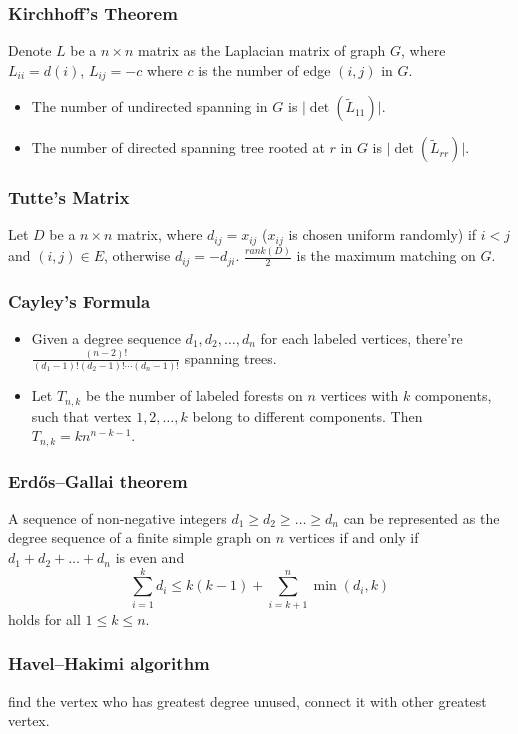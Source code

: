 \subsubsection{Kirchhoff's Theorem}
Denote $L$ be a $n \times n$ matrix as the Laplacian matrix of graph $G$, where $L_{ii} = d(i)$, $L_{ij} = -c$ where $c$ is the number of edge $(i, j)$ in $G$.
\begin{itemize}
    \item The number of undirected spanning in $G$ is $\lvert \det(\tilde{L}_{11}) \rvert$.
    \item The number of directed spanning tree rooted at $r$ in $G$ is $\lvert \det(\tilde{L}_{rr}) \rvert$.
\end{itemize}

\subsubsection{Tutte's Matrix}
Let $D$ be a $n \times n$ matrix, where $d_{ij} = x_{ij}$ ($x_{ij}$ is chosen uniform randomly) if $i < j$ and $(i, j) \in E$, otherwise $d_{ij} = -d_{ji}$. $\frac{rank(D)}{2}$ is the maximum matching on $G$.

\subsubsection{Cayley's Formula}
\begin{itemize}
  \item Given a degree sequence $d_1, d_2, \ldots, d_n$ for each labeled vertices, there're $\frac{(n - 2)!}{(d_1 - 1)!(d_2 - 1)!\cdots(d_n - 1)!}$ spanning trees.
  \item Let $T_{n, k}$ be the number of labeled forests on $n$ vertices with $k$ components, such that vertex $1, 2, \ldots, k$ belong to different components. Then $T_{n, k} = kn^{n - k - 1}$.
\end{itemize}

\subsubsection{Erdős–Gallai theorem}
A sequence of non-negative integers $d_1 \geq d_2 \geq \ldots \geq d_n$ can be represented as the degree sequence of a finite simple graph on $n$ vertices if and only if $d_1 + d_2 + \ldots + d_n$ is even and
$$ \sum_{i = 1}^{k}d_i \leq k(k - 1) + \sum_{i = k + 1}^{n}\min(d_i, k) $$
holds for all $1 \leq k \leq n$.

\subsubsection{Havel–Hakimi algorithm}
find the vertex who has greatest degree unused, connect it with other greatest vertex.

